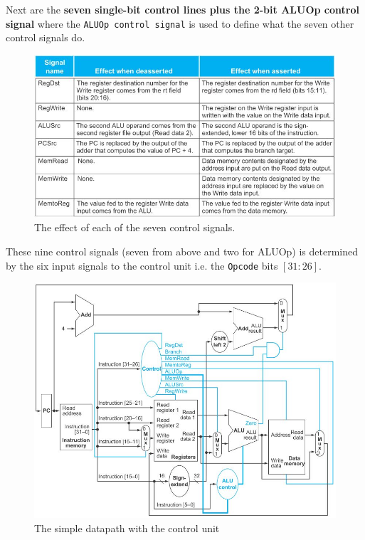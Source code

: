 \documentclass[10pt,a4paper]{article}
\begin{document}
\pagebreak

Next are the \textbf{seven single-bit control lines plus the 2-bit ALUOp control 
signal} where the \texttt{ALUOp control signal} is used to define what the seven other control
signals do. \par
\begin{figure} [h!]
    \centering
    \includegraphics[scale=0.8]{Control signals.JPG}
    \caption{The effect of each of the seven control signals.}
\end{figure}
These nine control signals (seven from above and two for ALUOp) is determined by the six input
signals to the control unit i.e. the \texttt{Opcode} bits $[31:26]$. 

\begin{figure} [h!]
    \centering
    \includegraphics[scale=0.69]{MIPS with control.JPG}
    \caption{The simple datapath with the control unit}
\end{figure}
\end{document}
